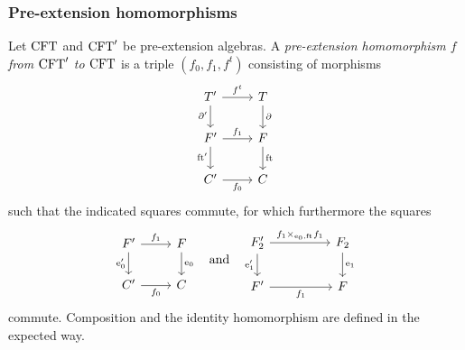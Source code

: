 \documentclass[handout]{beamer}
\begin{document}
\begin{frame}
\frametitle{Pre-extension homomorphisms}
\begin{footnotesize}
Let $\mathrm{CFT}$ and $\mathrm{CFT}'$ be pre-extension algebras. A \emph{pre-extension 
homomorphism $f$ from $\mathrm{CFT}'$ to $\mathrm{CFT}$} is a triple $(f_0,f_1,f^t)$ 
consisting of morphisms
\begin{equation*}
\begin{tikzcd}[ampersand replacement=\&]
\stesyst' 
  \ar{r}{f^t}
  \ar{d}[swap]{\ebd'}
  \&
\stesyst
  \ar{d}{\ebd}
  \\
\stesysf'
  \ar{r}{f_1}
  \ar{d}[swap]{\eft'}
  \&
\stesysf
  \ar{d}{\eft}
  \\
\stesysc' 
  \ar{r}[swap]{f_0}
  \&
\stesysc
\end{tikzcd}
\end{equation*}
such that the indicated squares commute, for which furthermore the squares
\begin{equation*}
\begin{tikzcd}[ampersand replacement=\&]
\stesysf' 
  \ar{r}{f_1}
  \ar{d}[swap]{\ectxext'}
  \&
\stesysf
  \ar{d}{\ectxext}
  \\
\stesysc'
  \ar{r}[swap]{f_0}
  \&
\stesysc
\end{tikzcd}
\quad
\text{and}
\quad
\begin{tikzcd}[ampersand replacement=\&,column sep=huge]
\stesysf_2'
  \ar{r}{f_1\times_{\ectxext,\eft} f_1}
  \ar{d}[swap]{\efamext'}
  \&
\stesysf_2
  \ar{d}{\efamext}
  \\
\stesysf'
  \ar{r}[swap]{f_1}
  \&
\stesysf
\end{tikzcd}
\end{equation*}
commute. Composition and the identity homomorphism are defined in the expected way.
\end{footnotesize}
\end{frame}
\end{document}
